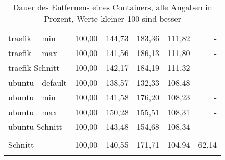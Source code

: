 \begin{footnotesize}
\begin{longtable}{llrrrrr}
		traefik                  & min             & 100,00 & 144,73 & 183,36  & 111,82                         & -     \\
		traefik                  & max             & 100,00 & 141,56 & 186,13  & 111,80                         & -     \\ \hline
		\multicolumn{2}{l}{traefik Schnitt}        & 100,00 & 142,17 & 184,19  & 111,32                         & -     \\ \hline
		ubuntu                   & default         & 100,00 & 138,57 & 132,33  & 108,48                         & -     \\
		ubuntu                   & min             & 100,00 & 141,58 & 176,20  & 108,23                         & -     \\
		ubuntu                   & max             & 100,00 & 150,28 & 155,51  & 108,31                         & -     \\ \hline
		\multicolumn{2}{l}{ubuntu Schnitt}         & 100,00 & 143,48 & 154,68  & 108,34                         & -     \\ \hline
		&                 &        &        &         &                                &       \\ \hline
		\multicolumn{2}{l}{Schnitt}                & 100,00 & 140,55 & 171,71  & 104,94                         & 62,14 \\ 
		\hline
		\caption[Dauer des Entfernens eines Containers]{Dauer des Entfernens eines Containers, \footnotesize alle Angaben in Prozent, Werte kleiner 100 sind besser}
		\label{tbl:timermerfergebnis}
	\end{longtable}
\end{footnotesize}



